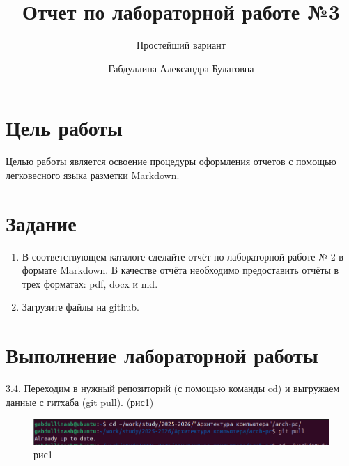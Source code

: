 \documentclass[
  english,
  russian,
  12pt,
  a4paper,
  DIV=11,
  numbers=noendperiod]{scrreprt}
\title{Отчет по лабораторной работе №3}
\subtitle{Простейший вариант}
\author{Габдуллина Александра Булатовна}
\date{}
\providecommand{\tightlist}{%
  \setlength{\itemsep}{0pt}\setlength{\parskip}{0pt}}
\renewcommand*\contentsname{Содержание}
\newcommand\contentsname{Содержание}
\begin{document}
\maketitle

\renewcommand*\contentsname{Содержание}
{
\setcounter{tocdepth}{1}
\tableofcontents
}
\listoffigures
\listoftables

\chapter{Цель
работы}\label{ux446ux435ux43bux44c-ux440ux430ux431ux43eux442ux44b}

Целью работы является освоение процедуры оформления отчетов с помощью
легковесного языка разметки Markdown.

\chapter{Задание}\label{ux437ux430ux434ux430ux43dux438ux435}

\begin{enumerate}
\def\labelenumi{\arabic{enumi}.}
\tightlist
\item
  В соответствующем каталоге сделайте отчёт по лабораторной работе № 2 в
  формате Markdown. В качестве отчёта необходимо предоставить отчёты в
  трех форматах: pdf, docx и md.
\item
  Загрузите файлы на github.
\end{enumerate}

\chapter{Выполнение лабораторной
работы}\label{ux432ux44bux43fux43eux43bux43dux435ux43dux438ux435-ux43bux430ux431ux43eux440ux430ux442ux43eux440ux43dux43eux439-ux440ux430ux431ux43eux442ux44b}

3.4. Переходим в нужный репозиторий (с помощью команды cd) и выгружаем
данные с гитхаба (git pull). (рис1)

\begin{figure}

{\centering \includegraphics[width=0.9\linewidth,height=\textheight,keepaspectratio]{image/рис1.png}

}

\caption{рис1}

\end{figure}%
\end{document}
